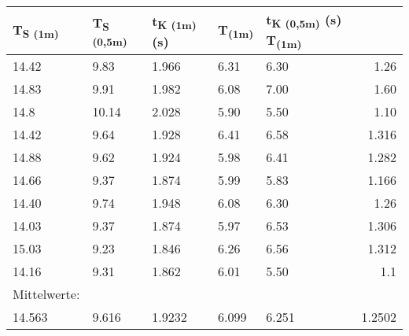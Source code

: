 \documentclass[titlepage=firstcover, captions=tableheading]{scrartcl}
\begin{document}
\begin{minipage}{\linewidth}
    \centering
    \begin{tabular}{lllllr}
        \toprule 
        T\textsubscript{S (1m)} & 
        T\textsubscript{S (0,5m)} &
        t\textsubscript{K (1m)} (s) &
        T\textsubscript{(1m)} & 
        t\textsubscript{K (0,5m)} (s)
        T\textsubscript{(1m)} & \\
        \midrule
        14.42 &  9.83 & 1.966 & 6.31 & 6.30 & 1.26 \\
        14.83 &  9.91 & 1.982 & 6.08 & 7.00 & 1.60 \\
        14.8  & 10.14 & 2.028 & 5.90 & 5.50 & 1.10 \\
        14.42 &  9.64 & 1.928 & 6.41 & 6.58 & 1.316\\
        14.88 &  9.62 & 1.924 & 5.98 & 6.41 & 1.282\\
        14.66 &  9.37 & 1.874 & 5.99 & 5.83 & 1.166\\
        14.40 &  9.74 & 1.948 & 6.08 & 6.30 & 1.26\\
        14.03 &  9.37 & 1.874 & 5.97 & 6.53 & 1.306\\
        15.03 &  9.23 & 1.846 & 6.26 & 6.56 & 1.312\\
        14.16 &  9.31 & 1.862 & 6.01 & 5.50 & 1.1\\
        \midrule
        Mittelwerte:\\
        14.563 & 9.616 & 1.9232 & 6.099 & 6.251 & 1.2502\\
        
        \bottomrule
        
    \end{tabular}
\end{minipage}
\end{document}
